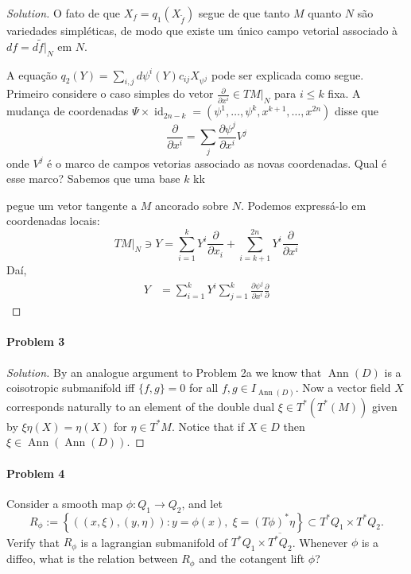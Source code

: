 \begin{proof}[Solution]
	O fato de que $X_f=q_1(X_{\tilde{f}})$ segue de que tanto $M$ quanto $N$ s\~ao variedades simpl\'eticas, de modo que existe um \'unico campo vetorial associado à  $df=d\tilde{f}|_{N}$ em $N$.

A equa\c c\~ao $q_2(Y)=\sum_{i,j}d\psi^i(Y)c_{ij}X_{\psi^j}$ pode ser explicada como segue. Primeiro considere o caso simples do vetor $\frac{\partial }{\partial x^i}\in TM|_{N}$ para $i\leq k$ fixa. A mudança de coordenadas $\Psi\times \operatorname{id}_{2n-k}=(\psi^1,\ldots,\psi^k,x^{k+1},\ldots,x^{2n})$ disse que
\[\frac{\partial }{\partial x^i}=\sum_{j}\frac{\partial \psi^j}{\partial x^i}V^j\]
onde $V^j$ \'e o marco de campos vetorias associado as novas coordenadas. Qual \'e esse marco? Sabemos que uma base $k$ kk


pegue um vetor tangente a $M$ ancorado sobre $N$. Podemos expressá-lo em coordenadas locais:
\[TM|_{N}\ni Y=\sum_{i=1}^kY^i\frac{\partial }{\partial x_i}+\sum_{i=k+1}^{2n}Y^i\frac{\partial }{\partial x^i}\]
Da\'i, \begin{align*}
	Y&=\sum_{i=1}^kY^i\sum_{j=1}^k\frac{\partial \psi^j}{\partial x^i}\frac{\partial }{\partial }
\end{align*}
\end{proof}

\paragraph{Problem 3}

\begin{proof}[Solution]\leavevmode
	By an analogue argument to Problem 2a we know that $\operatorname{Ann}(D)$ is a coisotropic submanifold iff $\{f,g\} =0$ for all $f,g\in I_{\operatorname{Ann}(D)}$. Now a vector field $X$ corresponds naturally to an element of the double dual $\xi \in T^*(T^*(M))$ given by $\xi\eta(X)=\eta(X)$ for  $\eta\in T^*M$. Notice that if $X \in D$ then $\xi \in \operatorname{Ann}(\operatorname{Ann}(D) ) $.
\end{proof}

\paragraph{Problem 4} Consider a smooth map $\phi:Q_1\to Q_2$, and let
\[R_{\phi}:=\left\{ \left( (x,\xi),(y,\eta) \right) :y=\phi(x),\;\xi=(T\phi)^*\eta \right\} \subset T^*Q_1\times T^*Q_2.\]
Verify that $R_\phi$ is a lagrangian submanifold of $T^* Q_1\times \overline{T^*Q_2}$. Whenever $\phi$ is a diffeo, what is the relation between $R_\phi$ and the cotangent lift $\hat{\phi}$?

